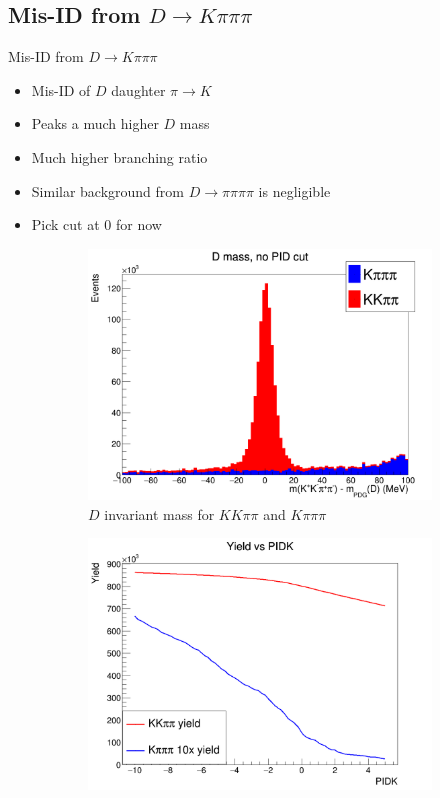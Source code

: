 \documentclass{beamer}
\begin{document}
\subsection{Mis-ID from \texorpdfstring{$D\to K\pi\pi\pi$}{D to Kpipipi}}
\begin{frame}{Mis-ID from $D\to K\pi\pi\pi$}
  \begin{itemize}
    \item{Mis-ID of $D$ daughter $\pi\to K$}
    \item{Peaks a much higher $D$ mass}
    \item{Much higher branching ratio}
    \item{Similar background from $D\to\pi\pi\pi\pi$ is negligible}
    \item{Pick cut at $0$ for now}
  \end{itemize}
  \begin{figure}
    \centering
    \vspace{-0.2cm}
    \begin{subfigure}{0.5\textwidth}
      \includegraphics[width = 1.0\textwidth]{B2DK_Dmass_Background.png}
      \caption{$D$ invariant mass for $KK\pi\pi$ and $K\pi\pi\pi$}
    \end{subfigure}%
    \begin{subfigure}{0.5\textwidth}
      \includegraphics[width = 1.0\textwidth]{YieldVSPIDK.png}

\end{subfigure}
\end{figure}
\end{frame}
\end{document}

